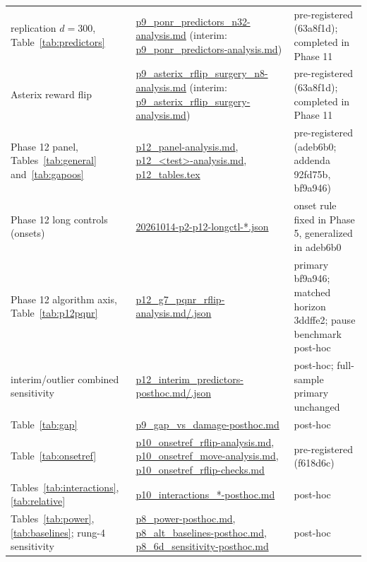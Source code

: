 \documentclass[10pt]{article} %
\begin{document}
\begin{table}[h]
\begin{tabular}{p{3.0cm}p{7.6cm}p{4.0cm}}
replication $d=300$, Table~\ref{tab:predictors} & \url{p9_ponr_predictors_n32-analysis.md} (interim: \url{p9_ponr_predictors-analysis.md}) & pre-registered (63a8f1d); completed in Phase 11 \\
Asterix reward flip & \url{p9_asterix_rflip_surgery_n8-analysis.md} (interim: \url{p9_asterix_rflip_surgery-analysis.md}) & pre-registered (63a8f1d); completed in Phase 11 \\
Phase 12 panel, Tables~\ref{tab:general} and~\ref{tab:gapoos} & \url{p12_panel-analysis.md}, \url{p12_<test>-analysis.md}, \url{p12_tables.tex} & pre-registered (adeb6b0; addenda 92fd75b, bf9a946) \\
Phase 12 long controls (onsets) & \url{20261014-p2-p12-longctl-*.json} & onset rule fixed in Phase 5, generalized in adeb6b0 \\
Phase 12 algorithm axis, Table~\ref{tab:p12pqnr} & \url{p12_g7_pqnr_rflip-analysis.md/.json} & primary bf9a946; matched horizon 3ddffe2; pause benchmark post-hoc \\
interim/outlier combined sensitivity & \url{p12_interim_predictors-posthoc.md/.json} & post-hoc; full-sample primary unchanged \\

Table~\ref{tab:gap} & \url{p9_gap_vs_damage-posthoc.md} & post-hoc \\
Table~\ref{tab:onsetref} & \url{p10_onsetref_rflip-analysis.md}, \url{p10_onsetref_move-analysis.md}, \url{p10_onsetref_rflip-checks.md} & pre-registered (f618d6c) \\
Tables~\ref{tab:interactions}, \ref{tab:relative} & \url{p10_interactions_*-posthoc.md} & post-hoc \\
Tables~\ref{tab:power}, \ref{tab:baselines}; rung-4 sensitivity & \url{p8_power-posthoc.md}, \url{p8_alt_baselines-posthoc.md}, \url{p8_6d_sensitivity-posthoc.md} & post-hoc \\
\bottomrule
\end{tabular}
\end{table}
\end{document}
